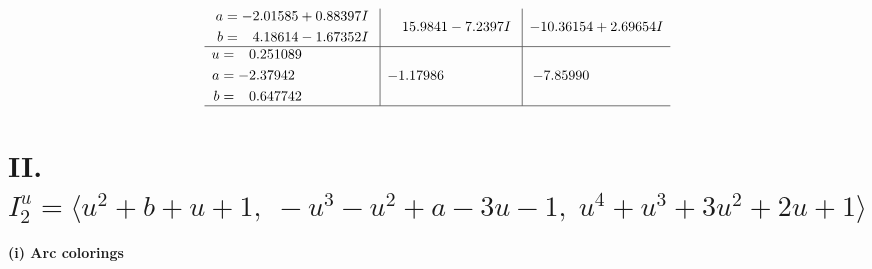 \documentclass[1p]{elsarticle_modified}
\theoremstyle{definition}
\begin{document}
$$\begin{array}{c|c|c}
\begin{aligned}
a &= -2.01585 + 0.88397 I \\
b &= \phantom{-}4.18614 - 1.67352 I\end{aligned}
 & \phantom{-}15.9841 - 7.2397 I & -10.36154 + 2.69654 I \\ \hline\begin{aligned}
u &= \phantom{-}0.251089\phantom{ +0.000000I} \\
a &= -2.37942\phantom{ +0.000000I} \\
b &= \phantom{-}0.647742\phantom{ +0.000000I}\end{aligned}
 & -1.17986\phantom{ +0.000000I} & -7.85990\phantom{ +0.000000I}\\
 \hline 
 \end{array}$$\newpage\newpage\renewcommand{\arraystretch}{1}
\centering \section*{II. $I^u_{2}= \langle u^2+b+u+1,\;- u^3- u^2+a-3 u-1,\;u^4+u^3+3 u^2+2 u+1 \rangle$}
\flushleft \textbf{(i) Arc colorings}\\
\end{document}

